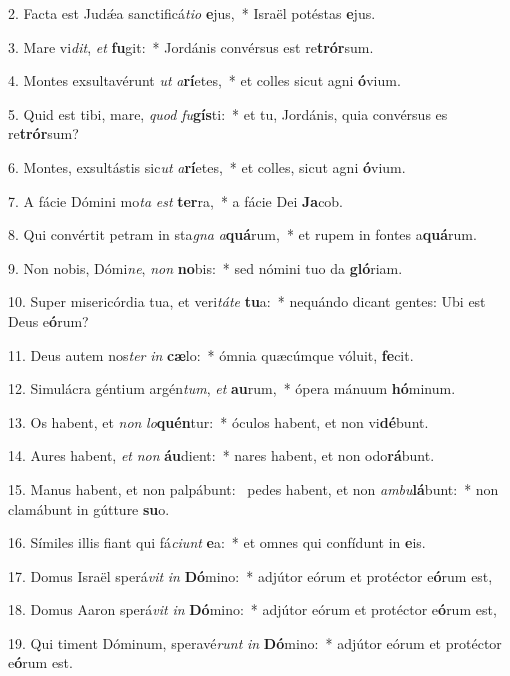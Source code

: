 2. Facta est Judǽa sanctificá\textit{ti}\textit{o} \textbf{e}jus,~*  Israël potéstas \textbf{e}jus.\

3. Mare vi\textit{dit}, \textit{et} \textbf{fu}git:~*  Jordánis convérsus est re\textbf{trór}sum.\

4. Montes exsultavérunt \textit{ut} \textit{a}\textbf{rí}etes,~*  et colles sicut agni \textbf{ó}vium.\

5. Quid est tibi, mare, \textit{quod} \textit{fu}\textbf{gís}ti:~*  et tu, Jordánis, quia convérsus es re\textbf{trór}sum?\

6. Montes, exsultástis sic\textit{ut} \textit{a}\textbf{rí}etes,~*  et colles, sicut agni \textbf{ó}vium.\

7. A fácie Dómini mo\textit{ta} \textit{est} \textbf{ter}ra,~*  a fácie Dei \textbf{Ja}cob.\

8. Qui convértit petram in sta\textit{gna} \textit{a}\textbf{quá}rum,~*  et rupem in fontes a\textbf{quá}rum.\

9. Non nobis, Dómi\textit{ne}, \textit{non} \textbf{no}bis:~*  sed nómini tuo da \textbf{gló}riam.\

10. Super misericórdia tua, et veri\textit{tá}\textit{te} \textbf{tu}a:~*  nequándo dicant gentes: Ubi est Deus e\textbf{ó}rum?\

11. Deus autem nos\textit{ter} \textit{in} \textbf{cæ}lo:~*  ómnia quæcúmque vóluit, \textbf{fe}cit.\

12. Simulácra géntium argén\textit{tum}, \textit{et} \textbf{au}rum,~*  ópera mánuum \textbf{hó}minum.\

13. Os habent, et \textit{non} \textit{lo}\textbf{quén}tur:~*  óculos habent, et non vi\textbf{dé}bunt.\

14. Aures habent, \textit{et} \textit{non} \textbf{áu}dient:~*  nares habent, et non odo\textbf{rá}bunt.\

15. Manus habent, et non palpábunt: \dag\  pedes habent, et non \textit{am}\textit{bu}\textbf{lá}bunt:~*  non clamábunt in gútture \textbf{su}o.\

16. Símiles illis fiant qui fá\textit{ci}\textit{unt} \textbf{e}a:~*  et omnes qui confídunt in \textbf{e}is.\

17. Domus Israël sperá\textit{vit} \textit{in} \textbf{Dó}mino:~*  adjútor eórum et protéctor e\textbf{ó}rum est,\

18. Domus Aaron sperá\textit{vit} \textit{in} \textbf{Dó}mino:~*  adjútor eórum et protéctor e\textbf{ó}rum est,\

19. Qui timent Dóminum, speravé\textit{runt} \textit{in} \textbf{Dó}mino:~*  adjútor eórum et protéctor e\textbf{ó}rum est.\

